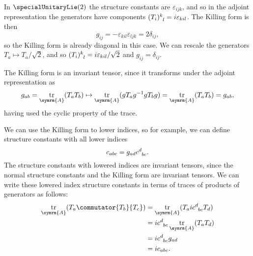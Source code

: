 \documentclass[fleqn]{NotesClass}
\DeclareMathOperator{\tr}{tr}
\begin{document}
    \begin{exm}{}{}
        In \(\specialUnitaryLie(2)\) the structure constants are \(\varepsilon_{ijk}\), and so in the adjoint representation the generators have components \(\tensor{(T_i)}{^k_l} = i\varepsilon_{kil}\).
        The Killing form is then
        \begin{equation}
            g_{ij} = -\varepsilon_{kil}\varepsilon_{ljk} = 2\delta_{ij},
        \end{equation}
        so the Killing form is already diagonal in this case.
        We can rescale the generators \(T_a \mapsto T_a/\sqrt{2}\), and so \(\tensor{(T_i)}{^k_l} = i\varepsilon_{kil}/\sqrt{2}\) and \(g_{ij} = \delta_{ij}\).
    \end{exm}
    
    The Killing form is an invariant tensor, since it transforms under the adjoint representation as
    \begin{equation}
        g_{ab} = \tr_{\symrm{A}}(T_aT_b) \mapsto \tr_{\symrm{A}}(gT_ag^{-1}gT_bg) = \tr_{\symrm{A}}(T_aT_b) = g_{ab},
    \end{equation}
    having used the cyclic property of the trace.
    
    We can use the Killing form to lower indices, so for example, we can define structure constants with all lower indices
    \begin{equation}
        c_{abc} = g_{ad}\tensor{c}{^d_{bc}}.
    \end{equation}
    The structure constants with lowered indices are invariant tensors, since the normal structure constants and the Killing form are invariant tensors.
    We can write these lowered index structure constants in terms of traces of products of generators as follows:
    \begin{align}
        \tr_{\symrm{A}}(T_a \commutator{T_b}{T_c}) &= \tr_{\symrm{A}}(T_a i\tensor{c}{^d_{bc}}T_d)\\
        &= i\tensor{c}{^d_{bc}} \tr_{\symrm{A}}(T_aT_d)\\
        &= i\tensor{c}{^d_{bc}} g_{ad}\\
        &= ic_{abc}.
    \end{align}
    
\end{document}
